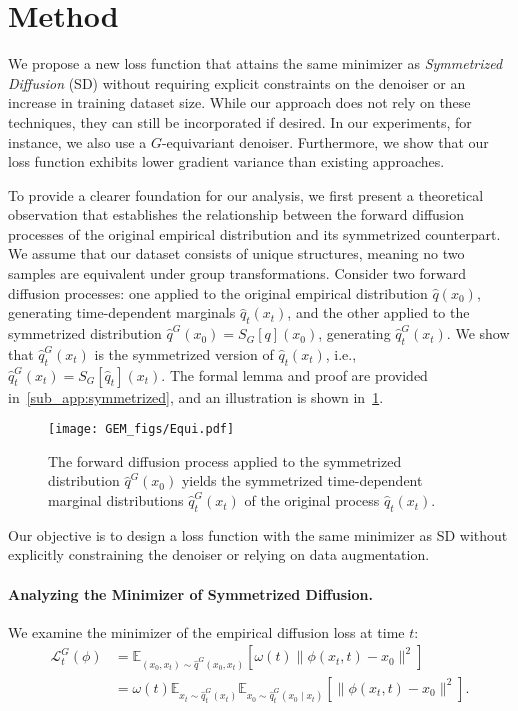 \section{Method}
\label{sec:method}

We propose a new loss function that attains the same minimizer as \emph{Symmetrized Diffusion} (SD) without requiring explicit constraints on the denoiser or an increase in training dataset size. While our approach does not rely on these techniques, they can still be incorporated if desired. In our experiments, for instance, we also use a \( G \)-equivariant denoiser. Furthermore, we show that our loss function exhibits lower gradient variance than existing approaches.


To provide a clearer foundation for our analysis, we first present a theoretical observation that establishes the relationship between the forward diffusion processes of the original empirical distribution and its symmetrized counterpart. We assume that our dataset consists of unique structures, meaning no two samples are equivalent under group transformations. Consider two forward diffusion processes: one applied to the original empirical distribution \( \hat{q}(x_0) \), generating time-dependent marginals \( \hat{q}_t(x_t) \), and the other applied to the symmetrized distribution \( \hat{q}^G(x_0) = S_G[q](x_0) \), generating \( \hat{q}_t^G(x_t) \). We show that \( \hat{q}_t^G(x_t) \) is the symmetrized version of \( \hat{q}_t(x_t) \), i.e., \( \hat{q}_t^G(x_t) = S_G[\hat{q}_t](x_t) \). The formal lemma and proof are provided in~\cref{sub_app:symmetrized}, and an illustration is shown in~\cref{fig:symmetrized_diffusion}.  
\begin{figure}[!h]
    \centering
    \texttt{[image: GEM\_figs/Equi.pdf]}
    \caption{The forward diffusion process applied to the symmetrized distribution \( \hat{q}^G(x_0) \) yields the symmetrized time-dependent marginal distributions \( \hat{q}_t^G(x_t) \) of the original process \( \hat{q}_t(x_t) \).}
    \label{fig:symmetrized_diffusion}
\end{figure}
Our objective is to design a loss function with the same minimizer as SD without explicitly constraining the denoiser or relying on data augmentation.


\paragraph{Analyzing the Minimizer of Symmetrized Diffusion.} We examine the minimizer of the empirical diffusion loss at time \(t\):
\begin{align}
    \mathcal{L}^G_t(\phi) &= \mathbb{E}_{(x_0, x_t) \sim \hat{q}^G(x_0, x_t)} \left[ \omega(t) \| \phi(x_t, t) - x_0 \|^2 \right] \nonumber \\
    &= \omega(t) \mathbb{E}_{x_t \sim \hat{q}^G_t(x_t)} \mathbb{E}_{x_0 \sim \hat{q}^G_t(x_0 \mid x_t)} \left[ \| \phi(x_t, t) - x_0 \|^2 \right] .
    \label{eqn:sym_loss}
\end{align}

